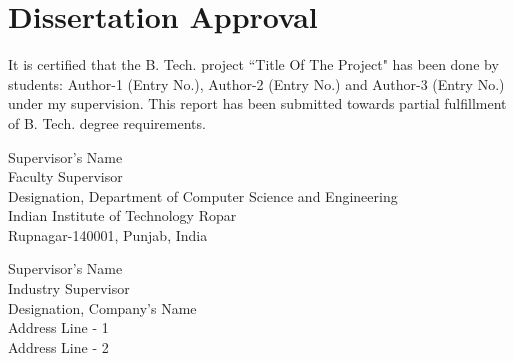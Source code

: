 \chapter*{\centering Dissertation Approval}
It is certified that the B. Tech. project ``Title Of The Project" has been done by students: Author-1 (Entry No.), Author-2 (Entry No.) and Author-3 (Entry No.) under my supervision. This report has been submitted towards partial fulfillment of B. Tech. degree requirements. \\
\vspace*{15mm}

\begin{flushright}
Supervisor's Name \\
Faculty Supervisor \\
Designation, Department of Computer Science and Engineering \\
Indian Institute of Technology Ropar \\
Rupnagar-140001, Punjab, India \\
\end{flushright}

\vspace*{15mm}

\begin{flushright}
Supervisor's Name \\
Industry Supervisor \\
Designation, Company's Name \\
Address Line - 1 \\
Address Line - 2 \\
\end{flushright}

